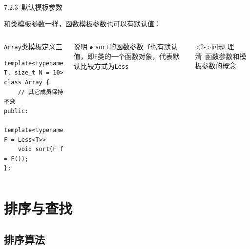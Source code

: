 \begin{frame}[fragile]{7.2.3~默认模板参数}

和\alert{类模板参数}一样，\alert{函数模板参数}也可以有默认值：

\vspace{-4mm}

\begin{columns}[t]

\begin{blueblock}{\texttt{Array}类模板定义三}
\vspace{-1mm}\begin{lstlisting}[moreemph={Array,T,Less,F}]
template<typename T, size_t N = 10>
class Array {
    // 其它成员保持不变
public:
    template<typename F = Less<T>>
    void sort(F f = F());
};
\end{lstlisting}\vspace{-1mm}
\end{blueblock}

\begin{yellowblock}{说明}
$\bullet$ \texttt{sort}的\alert{函数参数}~\texttt{f}也有默认值，即\texttt{F}类的一个函数对象，代表默认比较方式为\texttt{Less}
\end{yellowblock}
\begin{greenblock}<2->{问题}
理清~\alert{函数参数}和\alert{模板参数}的概念
\end{greenblock}

\end{columns}

\end{frame}


\section{排序与查找}

\subsection{排序算法}



